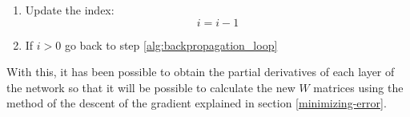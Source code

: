 \begin{enumerate}
    \item Update the index:
    \begin{equation}
    i = i-1
    \end{equation}
    
    \item If $i>0$ go back to step \ref{alg:backpropagation_loop}
\end{enumerate}

With this, it has been possible to obtain the partial derivatives of each layer of the network so that it will be possible to calculate the new $W$ matrices using the method of the descent of the gradient explained in section \ref{minimizing-error}.